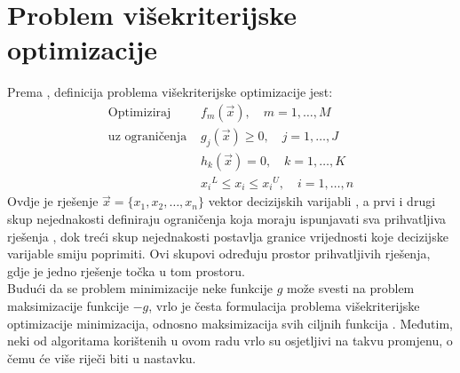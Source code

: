 \documentclass[times, utf8, zavrsni, numeric]{fer}
\begin{document}
\section{Problem višekriterijske optimizacije}
\label{sec:kriterij}
Prema \citep{pioa2013}, definicija problema višekriterijske optimizacije jest:
\begin{align*}
\mbox{Optimiziraj } &f_m(\vec{x}),\quad m = 1,\dots,M \\
\mbox{uz ograničenja } &g_j(\vec{x}) \geq 0, \quad j = 1,\dots,J \\
&h_k(\vec{x}) = 0, \quad k = 1,\dots,K \\
&{x_i}^L \leq x_i \leq {x_i}^U, \quad i = 1,\dots,n
\end{align*}
Ovdje je rješenje $\vec{x} = \{x_1, x_2, \dots, x_n\}$ vektor decizijskih varijabli , a prvi i drugi skup nejednakosti definiraju ograničenja koja moraju ispunjavati sva prihvatljiva rješenja , dok treći skup nejednakosti postavlja granice vrijednosti koje decizijske varijable smiju poprimiti. Ovi skupovi određuju prostor prihvatljivih rješenja, gdje je jedno rješenje točka u tom prostoru. \\
Budući da se problem minimizacije neke funkcije $g$ može svesti na problem maksimizacije funkcije $-g$, 
vrlo je česta formulacija problema višekriterijske optimizacije minimizacija, odnosno maksimizacija svih
ciljnih funkcija . Međutim, neki od algoritama korištenih u ovom radu vrlo su 
osjetljivi na takvu promjenu, o čemu će više riječi biti u nastavku.
\end{document}
